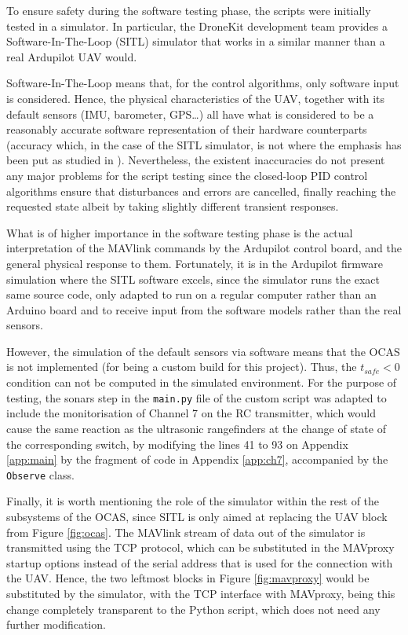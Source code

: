 To ensure safety during the software testing phase, the scripts were initially tested in a simulator.
In particular, the DroneKit development team provides a Software-In-The-Loop (SITL) simulator that works in a similar manner than a real Ardupilot UAV would.

Software-In-The-Loop means that, for the control algorithms, only software input is considered.
Hence, the physical characteristics of the UAV, together with its default sensors (IMU, barometer, GPS\ldots) all have what is considered to be a reasonably accurate software representation of their hardware counterparts (accuracy which, in the case of the SITL simulator, is not where the emphasis has been put as studied in \cite{vegaastorga2016}).
Nevertheless, the existent inaccuracies do not present any major problems for the script testing since the closed-loop PID control algorithms ensure that disturbances and errors are cancelled, finally reaching the requested state albeit by taking slightly different transient responses.

What is of higher importance in the software testing phase is the actual interpretation of the MAVlink commands by the Ardupilot control board, and the general physical response to them.
Fortunately, it is in the Ardupilot firmware simulation where the SITL software excels, since the simulator runs the exact same source code, only adapted to run on a regular computer rather than an Arduino board and to receive input from the software models rather than the real sensors.

However, the simulation of the default sensors via software means that the OCAS is not implemented (for being a custom build for this project).
Thus, the $t_{safe}<0$ condition can not be computed in the simulated environment.
For the purpose of testing, the sonars step in the \texttt{main.py} file of the custom script was adapted to include the monitorisation of Channel 7 on the RC transmitter, which would cause the same reaction as the ultrasonic rangefinders at the change of state of the corresponding switch, by modifying the lines 41 to 93 on Appendix \ref{app:main} by the fragment of code in Appendix \ref{app:ch7}, accompanied by the \texttt{Observe} class.

Finally, it is worth mentioning the role of the simulator within the rest of the subsystems of the OCAS, since SITL is only aimed at replacing the UAV block from Figure \ref{fig:ocas}.
The MAVlink stream of data out of the simulator is transmitted using the TCP protocol, which can be substituted in the MAVproxy startup options instead of the serial address that is used for the connection with the UAV.
Hence, the two leftmost blocks in Figure \ref{fig:mavproxy} would be substituted by the simulator, with the TCP interface with MAVproxy, being this change completely transparent to the Python script, which does not need any further modification.

